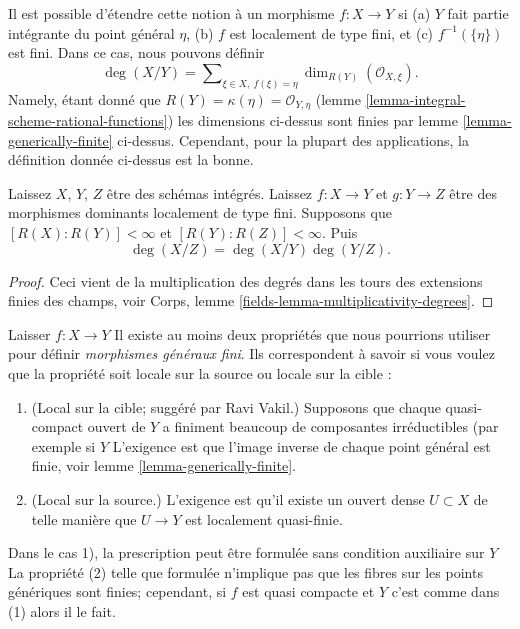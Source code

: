 \noindent
Il est possible d'étendre cette notion à un morphisme $f : X \to Y$ si (a) $Y$ fait partie intégrante du point général $\eta$, (b) $f$ est localement de type fini, et (c) $f^{-1}(\{\eta\})$ est fini. Dans ce cas, nous pouvons définir $$
\deg(X/Y)
=
\sum\nolimits_{\xi \in X, \ f(\xi) = \eta}
\dim_{R(Y)} (\mathcal{O}_{X, \xi}).
$$ Namely, étant donné que $R(Y) = \kappa(\eta) = \mathcal{O}_{Y, \eta}$ (lemme \ref{lemma-integral-scheme-rational-functions}) les dimensions ci-dessus sont finies par lemme \ref{lemma-generically-finite} ci-dessus. Cependant, pour la plupart des applications, la définition donnée ci-dessus est la bonne.

\begin{lemma}

\label{lemma-degree-composition}
Laissez $X$, $Y$, $Z$ être des schémas intégrés. Laissez $f : X \to Y$ et $g : Y \to Z$ être des morphismes dominants localement de type fini. Supposons que $[R(X) : R(Y)] < \infty$ et $[R(Y) : R(Z)] < \infty$. Puis $$
\deg(X/Z) = \deg(X/Y) \deg(Y/Z).
$$
\end{lemma}

\begin{proof}
Ceci vient de la multiplication des degrés dans les tours des extensions finies des champs, voir Corps, lemme \ref{fields-lemma-multiplicativity-degrees}.
\end{proof}

\begin{remark}

\label{remark-definition-generically-finite}

Laisser $f : X \to Y$ Il existe au moins deux propriétés que nous pourrions utiliser pour définir {\it morphismes généraux fini}. Ils correspondent à savoir si vous voulez que la propriété soit locale sur la source ou locale sur la cible :

\begin{enumerate}

\item (Local sur la cible; suggéré par Ravi Vakil.) Supposons que chaque quasi-compact ouvert de $Y$ a finiment beaucoup de composantes irréductibles (par exemple si $Y$ L'exigence est que l'image inverse de chaque point général est finie, voir lemme \ref{lemma-generically-finite}.
\item (Local sur la source.) L'exigence est qu'il existe un ouvert dense $U \subset X$ de telle manière que $U \to Y$ est localement quasi-finie.

\end{enumerate}

Dans le cas 1), la prescription peut être formulée sans condition auxiliaire sur $Y$La propriété (2) telle que formulée n'implique pas que les fibres sur les points génériques sont finies; cependant, si $f$ est quasi compacte et $Y$ c'est comme dans (1) alors il le fait.

\end{remark}

